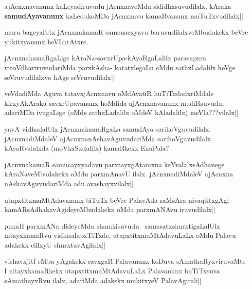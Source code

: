 \begin{artha}
ajAcnxnavanunx kaLeyadiruvudu jAcnxnaveMdu sididhxsuvudilalx, kAraka \textbf{samudAyavanunx} kaLedukoMDa jAcnxnavu kamaRvanunx muTuTxvudilalx||
\end{artha}

\begin{artha}
muru bageyalUlx jAcnxnakamaR samcuacxyavu baruvudilalxveMbudakekx beVre yukitxyanunx heVLutAtxre.
\end{artha}

\begin{artha}
jAcnxnakamaRgaLige kAraNa-savxrUpa-kAyaRgaLalilx parasapxra viroVdhaviruvudariMda parxkAsha- katatxlegaLu oMdu sathxLadalilx heVge seVruvudilalxvo hAge seVruvudilalx||
\end{artha}

\begin{artha}
veVdadiMda Aguva tatavxjAcnxnavu oMdAvatiR huTiTxdadxriMdale kirxyAkAraka savxrUpavanunx hoMdida ajAcnxnavanunx mudiRsuvudu, adariMDa ivugaLige (oMde sathxLadalilx oMdeV kAladalilx) meVla???vilalx||
\end{artha}

\begin{artha}
yavA vidhadalUlx jAcnxnakamaRgaLa samudAya sarihoVguvudilalx. jAcnxnadiMdaleV ajAcnxnanAshavAguvudariMda sarihoVguvudilalx. kAyaRvalalxda (moVkaSxdalilx) kamaRkekx EnuPala?
\end{artha}

\begin{artha}
jAcnxnakamaR samucayxyadavu parxtayxgAtamxna keYvalalxsAdhanege kAraNaveMbudakekx oMdu parxmAnavU ilalx. jAcnxnadiMdaleV ajAcnxna nAshavAguvudariMda adu avashayxvilalx||
\end{artha}

\begin{artha}
utapxtitxmuMtAdavanunx biTuTx beVre PalavAda saMsAra nivaqtitxgAgi kamARsAdhakavAgideyeMbudakekx oMdu parxmANAvu iruvudilalx||
\end{artha}


\begin{artha}
punaH parxmANa dideyeMdu shamkisuvudu-- samasatxshurxtigaLalUlx nitayxkamaRvu vidhisalapxTiTxde. utapxtitxmuMtAdavuLaLx oMdu Palavu adakekx elilxyU shurxtuvAgilalx||
\end{artha}

\begin{artha}
vishavxjitf eMba yAgakekx savxgaR Palavanunx koDuva sAmathaRyxviruvaMte I nitayxkamaRkekx utapxtitxmuMtAdavuLaLx Palavanunx huTiTxsuva sAmathayxRvu ilalx, adariMda adakekx mukitxyeV PalavAgirali||
\end{artha}

